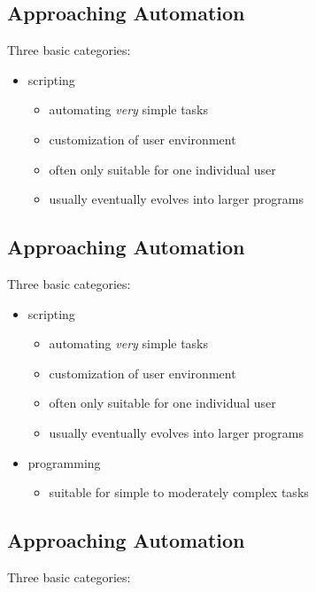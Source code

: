 \documentclass[xga]{xdvislides}
\begin{document}
\subsection{Approaching Automation}
Three basic categories:
\\

\begin{itemize}
	\item scripting
		\begin{itemize}
			\item automating {\em very} simple tasks
			\item customization of user environment
			\item often only suitable for one individual user
			\item usually eventually evolves into larger programs
		\end{itemize}
\end{itemize}


\subsection{Approaching Automation}
Three basic categories:
\\
\begin{itemize}
	\item scripting
		\begin{itemize}
			\item automating {\em very} simple tasks
			\item customization of user environment
			\item often only suitable for one individual user
			\item usually eventually evolves into larger programs
		\end{itemize}
	\item programming
		\begin{itemize}
			\item suitable for simple to moderately complex tasks
		\end{itemize}
\end{itemize}

\subsection{Approaching Automation}
Three basic categories:
\\
\end{document}
